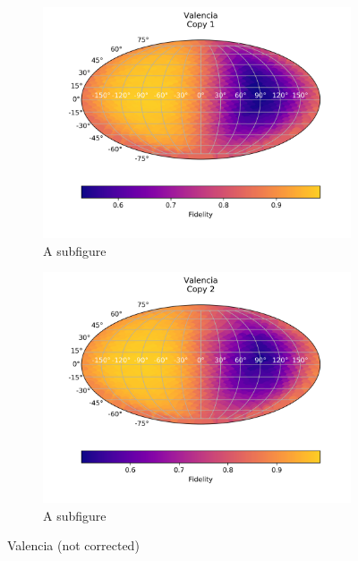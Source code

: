 \begin{figure}[H]
    \centering
    \begin{subfigure}{.5\textwidth}
      \centering
      \includegraphics[width=\textwidth]{Figures/Economical/IBM/FullSphere/results_valencia_copy1.png}
      \caption{A subfigure}
      \label{fig:ec_valencia_sphere_1}
    \end{subfigure}%
    \begin{subfigure}{.5\textwidth}
      \centering
      \includegraphics[width=\textwidth]{Figures/Economical/IBM/FullSphere/results_valencia_copy2.png}
      \caption{A subfigure}
      \label{fig:ec_valencia_sphere_2}
    \end{subfigure}
    \caption{Valencia (not corrected)}
    \label{fig:ec_valencia_sphere}
\end{figure}

